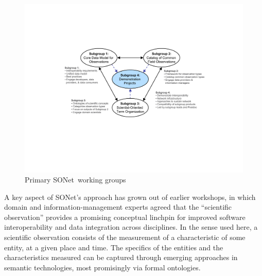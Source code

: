 \documentclass[10pt,twocolumn]{article}
\newcommand{\mypara}{\vspace{6pt}\noindent}
\newcommand{\sonet}{{SONet}}
\begin{document}
\begin{figure}[!b]
  \begin{footnotesize}
  \centering
  \includegraphics[scale=.4]{sonet-subgroups}
  \vspace{-8pt}
  \caption{{\small Primary \sonet\ working groups}}
  \label{fig:groups}
  \end{footnotesize}
\end{figure}

\mypara A key aspect of \sonet's approach has grown out of earlier
workshops, in which domain and information-management experts agreed
that the ``scientific observation'' provides a promising conceptual
linchpin for improved software interoperability and data integration
across disciplines. In the sense used here, a scientific observation
consists of the measurement of a characteristic of some entity, at a
given place and time.  The specifics of the entities and the
characteristics measured can be captured through emerging approaches
in semantic technologies, most promisingly via formal ontologies.
\end{document}
